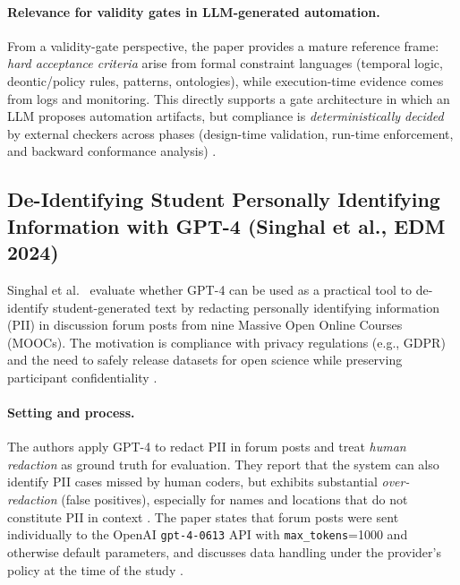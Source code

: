 \paragraph{Relevance for validity gates in LLM-generated automation.}
From a validity-gate perspective, the paper provides a mature reference frame:
\emph{hard acceptance criteria} arise from formal constraint languages (temporal logic, deontic/policy rules, patterns, ontologies),
while execution-time evidence comes from logs and monitoring. This directly supports a gate architecture in which an LLM proposes
automation artifacts, but compliance is \emph{deterministically decided} by external checkers across phases (design-time validation,
run-time enforcement, and backward conformance analysis) \cite{elkharbili2008bpcc,ABD05,RA08,SGN07}.

\subsection{De-Identifying Student Personally Identifying Information with GPT-4 (Singhal et al., EDM 2024)}
\label{subsec:deid-gpt4-edm2024}

Singhal et al.\ \cite{singhal2024deid_gpt4} evaluate whether GPT-4 can be used as a practical tool
to de-identify student-generated text by redacting personally identifying information (PII) in discussion
forum posts from nine Massive Open Online Courses (MOOCs).
The motivation is compliance with privacy regulations (e.g., GDPR) and the need to safely release datasets
for open science while preserving participant confidentiality \cite{singhal2024deid_gpt4}.

\paragraph{Setting and process.}
The authors apply GPT-4 to redact PII in forum posts and treat \emph{human redaction} as ground truth for evaluation.
They report that the system can also identify PII cases missed by human coders, but exhibits substantial
\emph{over-redaction} (false positives), especially for names and locations that do not constitute PII in context
\cite{singhal2024deid_gpt4}.
The paper states that forum posts were sent individually to the OpenAI \texttt{gpt-4-0613} API with
\texttt{max\_tokens}=1000 and otherwise default parameters, and discusses data handling under the provider’s
policy at the time of the study \cite{singhal2024deid_gpt4}.

